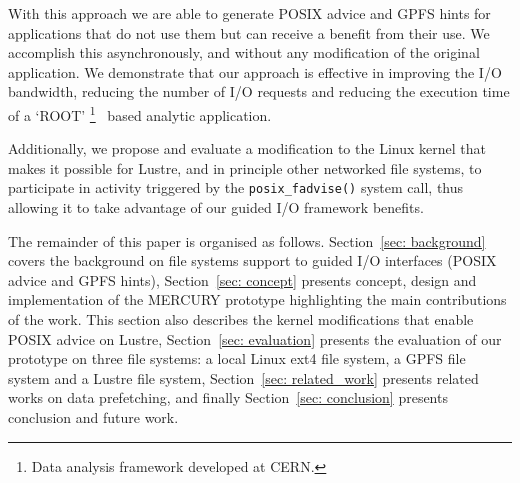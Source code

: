 With this approach we are able to generate POSIX advice and GPFS hints for applications that do not use them but can receive a benefit from their use. We accomplish this asynchronously, %
and without any modification of the original application. We demonstrate that our approach is effective in improving the I/O bandwidth, reducing the number of I/O requests and reducing the execution time of a `ROOT' \footnote{Data analysis framework developed at CERN.}~\cite{root} based analytic application.

Additionally, we propose and evaluate a modification to the Linux kernel that makes it possible for Lustre, and in principle other networked file systems, to participate in activity triggered by the \texttt{posix\_fadvise()} system call, thus allowing it to take advantage of our guided I/O framework benefits.

The remainder of this paper is organised as follows. Section~\ref{sec: background} covers the background on file systems support to guided I/O interfaces (POSIX advice and GPFS hints), Section~\ref{sec: concept} presents concept, design and implementation of the MERCURY prototype highlighting the main contributions of the work. This section also describes the kernel modifications that enable POSIX advice on Lustre, Section~\ref{sec: evaluation} presents the evaluation of our prototype on three file systems: a local Linux ext4 file system, a GPFS file system and a Lustre file system, Section~\ref{sec: related_work} presents related works on data prefetching, and finally Section~\ref{sec: conclusion} presents conclusion and future work.    


